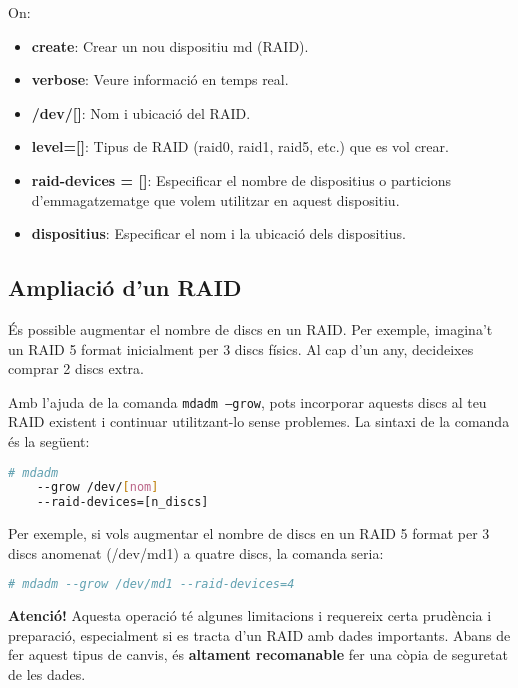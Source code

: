 On:

\begin{itemize}
    \item
    \textbf{create}: Crear un nou dispositiu md (RAID).
    \item
    \textbf{verbose}: Veure informació en temps real.
    \item
    \textbf{/dev/{[}{]}}: Nom i ubicació del RAID.
    \item
    \textbf{level={[}{]}}: Tipus de RAID (raid0, raid1, raid5, etc.) que es vol crear.
    \item
    \textbf{raid-devices = {[}{]}}: Especificar el nombre de dispositius o
    particions d'emmagatzematge que volem utilitzar en aquest dispositiu.
    \item
    \textbf{dispositius}: Especificar el nom i la ubicació dels
    dispositius.
\end{itemize}

\subsection{Ampliació d'un RAID}\label{ampliació-dun-raid}

És possible augmentar el nombre de discs en un RAID. Per exemple, imagina't un RAID 5 format inicialment per 3 discs físics. Al cap d'un any, decideixes comprar 2 discs extra. 

Amb l'ajuda de la comanda \texttt{mdadm --grow}, pots incorporar aquests discs al teu RAID existent i continuar utilitzant-lo sense problemes. La sintaxi de la comanda és la següent:

\begin{lstlisting}[language=bash, numbers=none, commentstyle=\color{black}]
# mdadm 
    --grow /dev/[nom] 
    --raid-devices=[n_discs] 
\end{lstlisting}

Per exemple, si vols augmentar el nombre de discs en un RAID 5 format per 3 discs anomenat (/dev/md1) a quatre discs, la comanda seria:

\begin{lstlisting}[language=bash, numbers=none, commentstyle=\color{black}]
# mdadm --grow /dev/md1 --raid-devices=4
\end{lstlisting}

\begin{mdframed}[linewidth=2pt,linecolor=red]
\textbf{Atenció!} Aquesta operació té algunes limitacions i requereix certa prudència i preparació, especialment si es tracta d'un RAID amb dades importants. Abans de fer aquest tipus de canvis, és \textbf{altament recomanable} fer una còpia de seguretat de les dades.
\end{mdframed}

